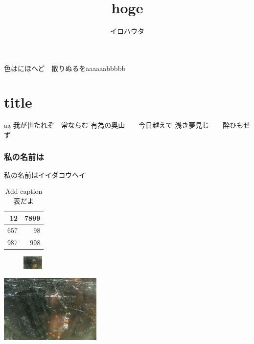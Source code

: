 \documentclass{ujarticle}
\title{hoge}
\author{イロハウタ}
\begin{document}
\maketitle

色はにほへど　散りぬるをaaaaaabbbbb\part{title}aa
我が世たれぞ　常ならむ
有為の奥山　　今日越えて
浅き夢見じ　　酔ひもせず

\newpage
\section{私の名前は}
私の名前はイイダコウヘイ

\begin{table}[htbp]
	\centering
	\caption{Add caption表だよ}
	\begin{tabular}{rr}
		\toprule
		12    & 7899 \\
		\midrule
		657   & 98 \\
		987   & 998 \\
		\bottomrule
	\end{tabular}%
	\label{tab:addlabel}%
	

\end{table}%

	
\begin{figure}
\centering
\includegraphics[width=1cm]{testimg.jpg}
\caption{}
\label{fig:acex1-1}
\end{figure}


\includegraphics[width=5cm]{testimg.jpg}
\end{document}
